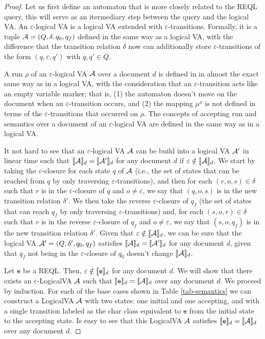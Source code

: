 \begin{proof}
	Let us first define an automaton that is more closely related to the REQL
	query, this will serve as an itermediary step between the query and the
	logical VA. An $\varepsilon$-logical VA is a logical VA extended with
	$\varepsilon$-transitions. Formally, it is a tuple $\mathcal{A} = (Q, \delta, q_0,
	q_f)$ defined in the same way as a logical VA, with the difference that the
	transition relation $\delta$ now can additionally store
	$\varepsilon$-transitions of the form $(q, \varepsilon, q')$ with $q, q' \in
	Q$.

	A run $\rho$ of an $\varepsilon$-logical VA $\mathcal{A}$ over a document $d$ is
	defined in in almost the exact same way as in a logical VA, with the
	consideration that an $\varepsilon$-transition acts like an empty variable
	marker; that is, (1) the automaton doesn't move on the document when an
	$\varepsilon$-transition occurs, and (2) the mapping $\mu^\rho$ is not
	defined in terms of the $\varepsilon$-transitions that occurred on $\rho$.
	The concepts of accepting run and semantics over a document of an
	$\varepsilon$-logical VA are defined in the same way as in a logical VA.

	It not hard to see that an $\varepsilon$-logical VA $\mathcal{A}$ can be build into
	a logical VA $\mathcal{A}'$ in linear time such that $\llbracket\mathcal{A}\rrbracket_{d} = \llbracket\mathcal{A}'\rrbracket_{d}$ for
	any document $d$ if $\varepsilon \notin \llbracket\mathcal{A}\rrbracket_{d}$. We start by taking the
	$\varepsilon$-closure for each state $q$ of $\mathcal{A}$ (i.e., the set of states
	that can be reached from $q$ by only traversing $\varepsilon$-transitions),
	and then for each $(r, o, s) \in \delta$ such that $r$ is in the
	$\varepsilon$-closure of $q$ and $o \neq \varepsilon$, we say that $(q, o,
	s)$ is in the new transition relation $\delta'$. We then take the reverse
	$\varepsilon$-closure of $q_f$ (the set of states that can reach $q_f$ by
	only traversing $\varepsilon$-transitions) and, for each $(s, o, r) \in
	\delta$ such that $r$ is in the reverse $\varepsilon$-closure of $q_f$ and
	$o \neq \varepsilon$, we say that $(s, o, q_f)$ is in the new transition
	relation $\delta'$. Given that $\varepsilon \notin \llbracket\mathcal{A}\rrbracket_{d}$, we can be
	sure that the logical VA $\mathcal{A}' = (Q, \delta', q_0, q_f)$ satisfies
	$\llbracket\mathcal{A}\rrbracket_{d} = \llbracket\mathcal{A}'\rrbracket_{d}$ for any document $d$, given that $q_f$ not being
	in the $\varepsilon$-closure of $q_0$ doesn't change $\llbracket\mathcal{A}\rrbracket_{d}$.

	Let $\texttt{e}$ be a REQL. Then, $\varepsilon \notin \llbracket\texttt{e}\rrbracket_{d}$ for
	any document $d$. We will show that there exists an $\varepsilon$-LogicalVA
	$\mathcal{A}$ such that $\llbracket\texttt{e}\rrbracket_d = \llbracket\mathcal{A}\rrbracket_d$ over any document $d$. We
	proceed by induction. For each of the base cases shown in Table
	\ref*{tab-semantics} we can construct a LogicalVA $\mathcal{A}$ with two states: one
	initial and one accepting, and with a single transition labeled as the char
	class equivalent to $\texttt{e}$ from the initial state to the accepting
	state. Is easy to see that this LogicalVA $\mathcal{A}$ satisfies
	$\llbracket\texttt{e}\rrbracket_d = \llbracket\mathcal{A}\rrbracket_d$ over any document $d$.


\end{proof}
